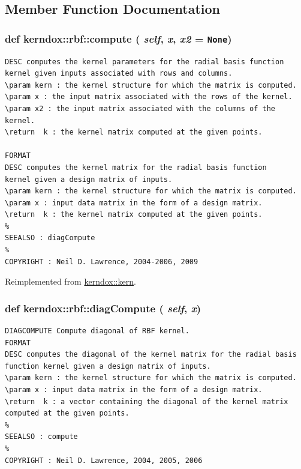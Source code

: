 \subsection{Member Function Documentation}
\hypertarget{classkerndox_1_1rbf_a041cf766fdfa3d3ddd373171e9b7d76}{
\subsubsection[{compute}]{\setlength{\rightskip}{0pt plus 5cm}def kerndox::rbf::compute ( {\em self}, \/   {\em x}, \/   {\em x2} = {\tt None})}}
\label{classkerndox_1_1rbf_a041cf766fdfa3d3ddd373171e9b7d76}




\footnotesize\begin{verbatim}DESC computes the kernel parameters for the radial basis function
kernel given inputs associated with rows and columns.
\param kern : the kernel structure for which the matrix is computed.
\param x : the input matrix associated with the rows of the kernel.
\param x2 : the input matrix associated with the columns of the kernel.
\return  k : the kernel matrix computed at the given points.
 
FORMAT
DESC computes the kernel matrix for the radial basis function
kernel given a design matrix of inputs.
\param kern : the kernel structure for which the matrix is computed.
\param x : input data matrix in the form of a design matrix.
\return  k : the kernel matrix computed at the given points.
%
SEEALSO : diagCompute
%
COPYRIGHT : Neil D. Lawrence, 2004-2006, 2009

\end{verbatim}
\normalsize
 

Reimplemented from \hyperlink{classkerndox_1_1kern}{kerndox::kern}.\hypertarget{classkerndox_1_1rbf_b29662ffe6791729f8e671a62e0a84b9}{
\subsubsection[{diagCompute}]{\setlength{\rightskip}{0pt plus 5cm}def kerndox::rbf::diagCompute ( {\em self}, \/   {\em x})}}
\label{classkerndox_1_1rbf_b29662ffe6791729f8e671a62e0a84b9}




\footnotesize\begin{verbatim}DIAGCOMPUTE Compute diagonal of RBF kernel.
FORMAT
DESC computes the diagonal of the kernel matrix for the radial basis function kernel given a design matrix of inputs.
\param kern : the kernel structure for which the matrix is computed.
\param x : input data matrix in the form of a design matrix.
\return  k : a vector containing the diagonal of the kernel matrix
computed at the given points.
%
SEEALSO : compute
%
COPYRIGHT : Neil D. Lawrence, 2004, 2005, 2006

\end{verbatim}
\normalsize
 

